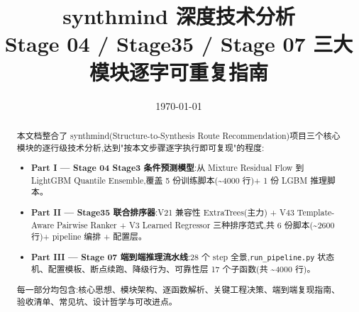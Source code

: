 \documentclass[11pt,a4paper]{article}
\title{\bfseries synthmind 深度技术分析\\
       \large{Stage 04 / Stage35 / Stage 07 三大模块逐字可重复指南}}
\author{}
\date{\today}
\newcommand{\file}[1]{\texttt{\small #1}}
\begin{document}
\maketitle

\begin{abstract}
本文档整合了 synthmind(Structure-to-Synthesis Route Recommendation)项目三个核心模块的逐行级技术分析,达到"按本文步骤逐字执行即可复现"的程度:

\begin{itemize}
    \item \textbf{Part I — Stage 04 Stage3 条件预测模型}:从 Mixture Residual Flow 到 LightGBM Quantile Ensemble,覆盖 5 份训练脚本(\textasciitilde 4000 行)+ 1 份 LGBM 推理脚本。
    \item \textbf{Part II — Stage35 联合排序器}:V21 兼容性 ExtraTrees(主力) + V43 Template-Aware Pairwise Ranker + V3 Learned Regressor 三种排序范式,共 6 份脚本(\textasciitilde 2600 行)+ pipeline 编排 + 配置层。
    \item \textbf{Part III — Stage 07 端到端推理流水线}:28 个 step 全景,\file{run\_pipeline.py} 状态机、配置模板、断点续跑、降级行为、可靠性层 17 个子函数(共 \textasciitilde 4000 行)。
\end{itemize}

每一部分均包含:核心思想、模块架构、逐函数解析、关键工程决策、端到端复现指南、验收清单、常见坑、设计哲学与可改进点。

\end{abstract}

\tableofcontents
\newpage


\newpage


\newpage


\end{document}
